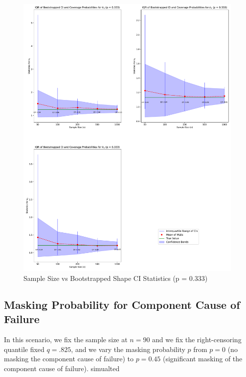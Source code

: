 \documentclass[
]{article}
\begin{document}
\begin{figure}

{\centering \includegraphics{image/plot-n-vs-stats-p333-shape} 

}

\caption{Sample Size vs Bootstrapped Shape CI Statistics (p = 0.333)}\label{fig:samp-size-n-vs-stats-p333-shape}
\end{figure}

\hypertarget{sec:p-vs-mttf}{%
\subsection{Masking Probability for Component Cause of
Failure}\label{sec:p-vs-mttf}}

In this scenario, we fix the sample size at \(n = 90\) and we fix the
right-censoring quantile fixed \(q = .825\), and we vary the masking
probability \(p\) from \(p = 0\) (no masking the component cause of
failure) to \(p = 0.45\) (significant masking of the component cause of
failure). simualted
\end{document}
